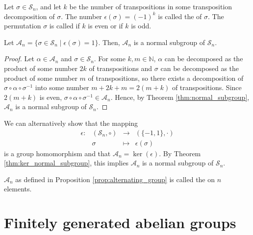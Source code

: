 \begin{defn}
Let $ \sigma\in\mathcal{S}_n $, and let $ k $ be the number of transpositions in some transposition decomposition of $ \sigma $. The number $ \epsilon(\sigma)=(-1)^k $ is called the  of $ \sigma $. The permutation $ \sigma $ is called  if $ k $ is even or  if $ k $ is odd.
\end{defn}

\begin{prop}\label{prop:alternating_group}
Let $ \mathcal{A}_n=\{\sigma\in\mathcal{S}_n\mid\epsilon(\sigma)=1\} $. Then, $ \mathcal{A}_n $ is a normal subgroup of $ \mathcal{S}_n $.
\end{prop}
\begin{proof}
Let $ \alpha\in\mathcal{A}_n $ and $ \sigma\in\mathcal{S}_n $. For some $ k,m\in\mathbb{N} $, $ \alpha $ can be decomposed as the product of some number $ 2k $ of transpositions and $ \sigma $ can be decomposed as the product of some number $ m $ of transpositions, so there exists a decomposition of $ \sigma\circ\alpha\circ\sigma^{-1} $ into some number $ m+2k+m=2(m+k) $ of transpositions. Since $ 2(m+k) $ is even, $ \sigma\circ\alpha\circ\sigma^{-1}\in\mathcal{A}_n $. Hence, by Theorem \ref{thm:normal_subgroup}, $ \mathcal{A}_n $ is a normal subgroup of $ \mathcal{S}_n $.
\end{proof}

We can alternatively show that the mapping
\begin{equation*}
    \begin{array}{rccc}
        \epsilon: & (\mathcal{S}_n,\circ) & \to & (\{-1,1\},\cdot) \\
        & \sigma & \mapsto & \epsilon(\sigma)
    \end{array}
\end{equation*}
is a group homomorphism and that $ \mathcal{A}_n=\ker(\epsilon) $. By Theorem \ref{thm:ker_normal_subgroup}, this implies $ \mathcal{A}_n $ is a normal subgroup of $ \mathcal{S}_n $.

\begin{defn}
$ \mathcal{A}_n $ as defined in Proposition \ref{prop:alternating_group} is called the  on $ n $ elements.
\end{defn}

\section{Finitely generated abelian groups}

